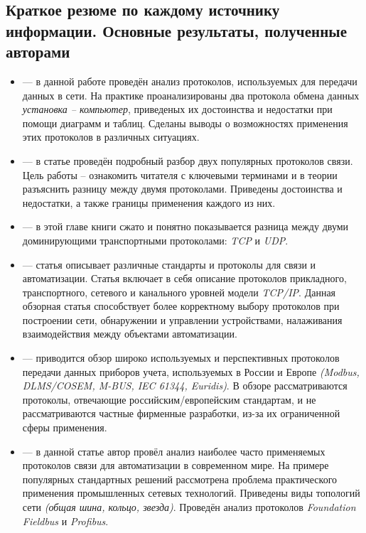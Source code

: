 \subsection{Краткое резюме по каждому источнику информации. Основные результаты, полученные авторами}
\begin{itemize}[label=]
	\item \cite{hussein_wheeb_performance_2015} ---  в данной работе проведён анализ протоколов, используемых для передачи данных в сети. На практике проанализированы два протокола обмена данных \textit{установка -- компьютер}, приведеных их достоинства и недостатки при помощи диаграмм и таблиц. Сделаны выводы о возможностях применения этих протоколов в различных ситуациях. 
	\item \cite{kumar_survey_2012} --- в статье проведён подробный разбор двух популярных протоколов связи. Цель работы -- ознакомить читателя с ключевыми терминами и в теории разъяснить разницу между двумя протоколами. Приведены достоинства и недостатки, а также границы применения каждого из них.
	\item \cite{noergaard_chapter_2010} --- в этой главе книги сжато и понятно показывается разница между двуми доминирующими транспортными протоколами: \textit{TCP} и \textit{UDP}. 
	\item \cite{__2017-1} --- статья описывает различные стандарты и протоколы для связи и автоматизации. Статья включает в себя описание протоколов прикладного, транспортного, сетевого и канального уровней модели \textit{TCP/IP}. Данная обзорная статья способствует более корректному выбору протоколов при построении сети, обнаружении и управлении устройствами, налаживания взаимодействия между объектами автоматизации.
	\item \cite{__2016} --- приводится обзор широко используемых и перспективных протоколов передачи данных приборов учета, используемых в России и Европе \textit{(Modbus,  DLMS/COSEM, M-BUS, IEC 61344, Euridis)}. В обзоре рассматриваются протоколы, отвечающие российским/европейским стандартам, и не рассматриваются частные фирменные разработки, из-за	их ограниченной сферы применения.
	\item \cite{__2001} --- в данной статье автор провёл анализ наиболее часто применяемых протоколов связи для автоматизации в современном мире. На примере популярных стандартных решений рассмотрена проблема практического применения промышленных сетевых технологий. Приведены виды топологий сети \textit{(общая шина, кольцо, звезда)}. Проведён анализ протоколов \textit{Foundation Fieldbus} и \textit{Profibus}.

\end{itemize}
